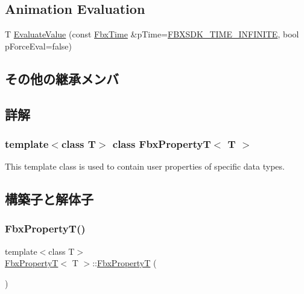 \subsection*{Animation Evaluation}
\begin{DoxyCompactItemize}
\item 
T \hyperlink{class_fbx_property_t_a07f3d2e638b5f65838338eb03296c3f9}{Evaluate\+Value} (const \hyperlink{class_fbx_time}{Fbx\+Time} \&p\+Time=\hyperlink{fbxtime_8h_a1e6db3fe0f84f0b7daa775739f93526f}{F\+B\+X\+S\+D\+K\+\_\+\+T\+I\+M\+E\+\_\+\+I\+N\+F\+I\+N\+I\+TE}, bool p\+Force\+Eval=false)
\end{DoxyCompactItemize}
\subsection*{その他の継承メンバ}


\subsection{詳解}
\subsubsection*{template$<$class T$>$\newline
class Fbx\+Property\+T$<$ T $>$}

This template class is used to contain user properties of specific data types. 

\subsection{構築子と解体子}
\mbox{\label{class_fbx_property_t_a60e994b93527d29bf782be402dfe430f}} 
\subsubsection{\texorpdfstring{Fbx\+Property\+T()}{FbxPropertyT()}\hspace{0.1cm}{\footnotesize\ttfamily [1/2]}}
{\footnotesize\ttfamily template$<$class T$>$ \\
\hyperlink{class_fbx_property_t}{Fbx\+PropertyT}$<$ T $>$\+::\hyperlink{class_fbx_property_t}{Fbx\+PropertyT} (\begin{DoxyParamCaption}{ }\end{DoxyParamCaption})}

